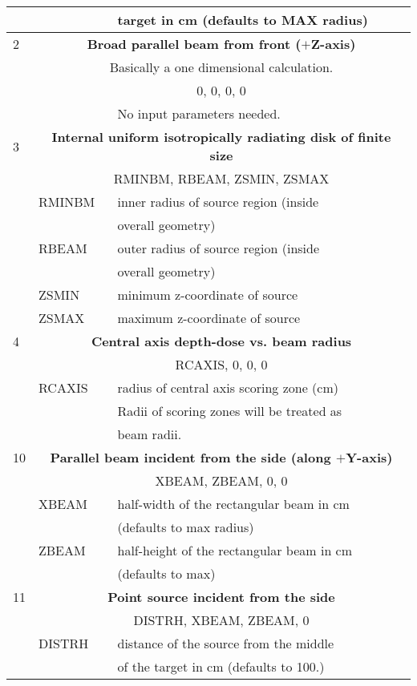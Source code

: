 \begin{longtable}{lll}
  &                & target in cm (defaults to MAX radius) \\
\hline 
2 & \multicolumn{2}{c}{\bf Broad parallel beam from front ($+$Z-axis)} \\
  & \multicolumn{2}{c}{Basically a one dimensional calculation.} \\
  & \multicolumn{2}{c}{      0, 0, 0, 0} \\
 & & No input parameters needed.\\
\hline
3 & \multicolumn{2}{c}{\bf Internal uniform isotropically radiating disk of finite size}\\
  & \multicolumn{2}{c}{      RMINBM, RBEAM, ZSMIN, ZSMAX}\\
  & RMINBM  & inner radius of source region (inside\\
  &         & overall geometry)\\
  & RBEAM   & outer radius of source region (inside\\
  &         & overall geometry)\\
  & ZSMIN   & minimum z-coordinate of source \\
  & ZSMAX   & maximum z-coordinate of source \\
\hline
4 & \multicolumn{2}{c}{\bf Central axis depth-dose vs. beam radius}\\
  & \multicolumn{2}{c}{      RCAXIS, 0, 0, 0}\\
  & RCAXIS  & radius of central axis scoring zone (cm) \\
  &         & Radii of scoring zones will be treated as\\
  &         & beam radii.\\
\hline
10& \multicolumn{2}{c}{\bf Parallel beam incident from the side (along $+$Y-axis)}\\
  & \multicolumn{2}{c}{      XBEAM, ZBEAM, 0, 0}\\
  & XBEAM   & half-width of the rectangular beam in cm\\
  &                & (defaults to max radius)\\
  & ZBEAM   & half-height of the rectangular beam in cm\\
  &                & (defaults to max)\\
\hline
11&\multicolumn{2}{c}{\bf Point source incident from the side}\\
  &\multicolumn{2}{c}{      DISTRH, XBEAM, ZBEAM, 0}\\
  &DISTRH   & distance of the source from the middle\\
  &                & of the target in cm (defaults to 100.)\\

\end{longtable}
